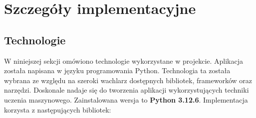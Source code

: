 \chapter{Szczegóły implementacyjne}

\section{Technologie}
\label{sec:technologies}
W niniejszej sekcji omówiono technologie wykorzystane w projekcie. Aplikacja została napisana w języku programowania Python. Technologia ta została wybrana ze względu na szeroki wachlarz dostępnych bibliotek, frameworków oraz narzędzi. Doskonale nadaje się do tworzenia aplikacji wykorzystujących techniki uczenia maszynowego. Zainstalowana wersja to \textbf{Python 3.12.6}. Implementacja korzysta z następujących bibliotek:

